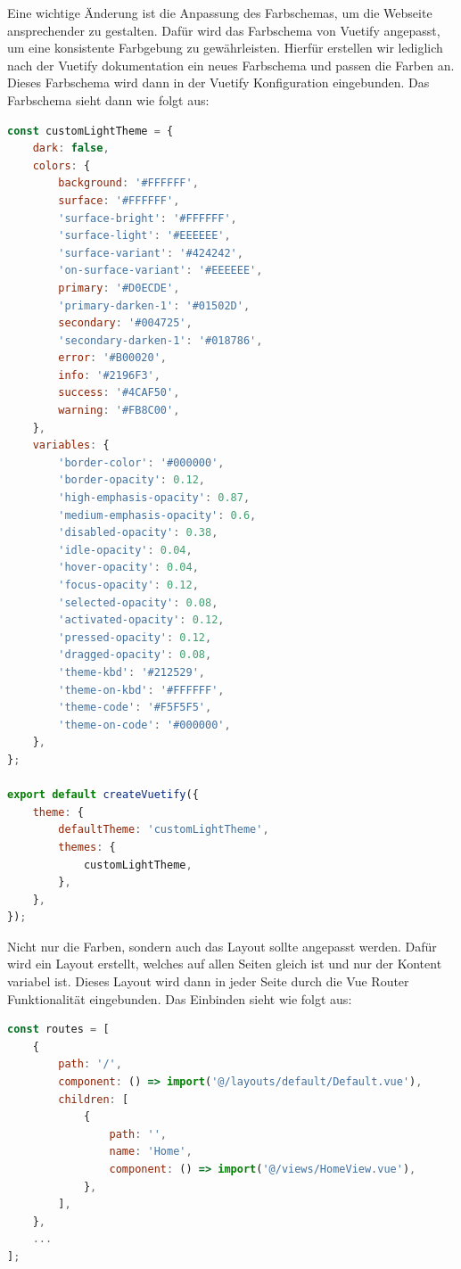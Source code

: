 Eine wichtige Änderung ist die Anpassung des Farbschemas, um die Webseite ansprechender zu gestalten. Dafür wird das Farbschema von Vuetify angepasst, um eine konsistente Farbgebung zu gewährleisten. Hierfür erstellen wir lediglich nach der Vuetify dokumentation ein neues Farbschema und passen die Farben an. Dieses Farbschema wird dann in der Vuetify Konfiguration eingebunden. Das Farbschema sieht dann wie folgt aus: \cite{vuetiy-custom-color-theme}

\begin{lstlisting}[language={JavaScript}, caption={Vuetify Farbschema anpassung}]
const customLightTheme = {
    dark: false,
    colors: {
        background: '#FFFFFF',
        surface: '#FFFFFF',
        'surface-bright': '#FFFFFF',
        'surface-light': '#EEEEEE',
        'surface-variant': '#424242',
        'on-surface-variant': '#EEEEEE',
        primary: '#D0ECDE',
        'primary-darken-1': '#01502D',
        secondary: '#004725',
        'secondary-darken-1': '#018786',
        error: '#B00020',
        info: '#2196F3',
        success: '#4CAF50',
        warning: '#FB8C00',
    },
    variables: {
        'border-color': '#000000',
        'border-opacity': 0.12,
        'high-emphasis-opacity': 0.87,
        'medium-emphasis-opacity': 0.6,
        'disabled-opacity': 0.38,
        'idle-opacity': 0.04,
        'hover-opacity': 0.04,
        'focus-opacity': 0.12,
        'selected-opacity': 0.08,
        'activated-opacity': 0.12,
        'pressed-opacity': 0.12,
        'dragged-opacity': 0.08,
        'theme-kbd': '#212529',
        'theme-on-kbd': '#FFFFFF',
        'theme-code': '#F5F5F5',
        'theme-on-code': '#000000',
    },
};

export default createVuetify({
    theme: {
        defaultTheme: 'customLightTheme',
        themes: {
            customLightTheme,
        },
    },
});
\end{lstlisting}

Nicht nur die Farben, sondern auch das Layout sollte angepasst werden.
Dafür wird ein Layout erstellt, welches auf allen Seiten gleich ist und nur der Kontent variabel ist.
Dieses Layout wird dann in jeder Seite durch die Vue Router Funktionalität eingebunden.
Das Einbinden sieht wie folgt aus:

\begin{lstlisting}[language={JavaScript}, caption={Einbindung des Layouts in der Vue Router Konfiguration}]
const routes = [
    {
        path: '/',
        component: () => import('@/layouts/default/Default.vue'),
        children: [
            {
                path: '',
                name: 'Home',
                component: () => import('@/views/HomeView.vue'),
            },
        ],
    },
    ...
];
\end{lstlisting}

